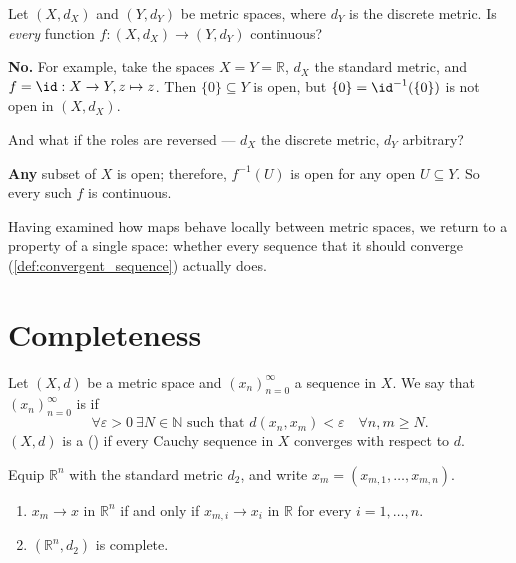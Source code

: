 \begin{question}
Let $(X, d_X)$ and $(Y, d_Y)$ be metric spaces, where $d_Y$ is the discrete metric. Is
\emph{every} function $f : (X,d_X) \to (Y,d_Y)$ continuous?
\end{question}

\begin{answer}
\textbf{No.} For example, take the spaces $X = Y = \mathbb{R}$, $d_X$ the standard metric, and
$f = \id : X \to Y, z \mapsto z$. Then $\{0\} \subseteq Y$ is open, but
$\{0\} = \id^{-1}(\{0\})$ is not open in $(X, d_X)$.
\end{answer}

\begin{question}
And what if the roles are reversed --- $d_X$ the discrete metric, $d_Y$ arbitrary?
\end{question}

\begin{answer}
\textbf{Any} subset of $X$ is open; therefore, $f^{-1}(U)$ is open for any open $U \subseteq Y$. So
every such $f$ is continuous.
\end{answer}

Having examined how maps behave locally between metric spaces, we return to a property of a
single space: whether every sequence that  it should converge (\cref{def:convergent_sequence})
actually does.

\section{Completeness}
\label{sec:completeness}

\begin{definition}
\label{def:complete_metric_space}
Let $(X,d)$ be a metric space and $(x_n)_{n=0}^{\infty}$ a sequence in $X$. We say that
$(x_n)_{n=0}^{\infty}$ is  if
\[\forall \varepsilon > 0 \ \exists N \in \mathbb{N} \text{ such that } d(x_n, x_m) < \varepsilon \quad \forall n, m \geq N.\]
$(X,d)$ is a  () if
every Cauchy sequence in $X$ converges with respect to $d$.
\end{definition}

\begin{proposition}
\label{prop:Rn_coordinatewise_complete}
Equip $\mathbb{R}^n$ with the standard metric $d_2$, and write
$x_m = (x_{m,1},\dots,x_{m,n})$.
\begin{enumerate}[label=\textbf{(\alph*)}]
  \item $x_m \to x$ in $\mathbb{R}^n$ if and only if $x_{m,i} \to x_i$ in $\mathbb{R}$ for every
    $i = 1,\dots,n$.
  \item $(\mathbb{R}^n, d_2)$ is complete.
\end{enumerate}
\end{proposition}

